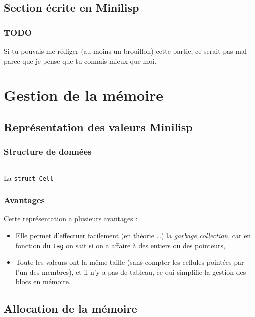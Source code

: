 \documentclass[c, 11pt, handout, xcolor=table]{beamer}
\newcommand{\source}[5]{
  \begin{table}[H]
    \centering
    \inputminted[frame=lines,linenos,style=colorful,fontfamily=tt,breaklines,autogobble,firstline=#3,firstnumber=#3,lastline=#4,label={#2[#3--#4]}]{#1}{../interim/sledge/#2}
    \captionsetup{name=Listing,labelformat=listing,labelsep=endash}
    \caption{#5}
  \end{table}
  }
\newcommand{\sourceC}[4]{\source{C}{#1}{#2}{#3}{#4}}
\newcommand{\codeC}[1]{\texttt{#1}}
\newcommand{\foreign}[1]{\emph{#1}}
\begin{document}
\subsection{Section écrite en Minilisp}

\begin{frame}
 \frametitle{TODO}
 Si tu pouvais me rédiger (au moins un brouillon) cette partie, ce serait pas mal parce que je pense que tu connais mieux que moi.
\end{frame}


\section{Gestion de la mémoire}

\subsection{Représentation des valeurs Minilisp}

\begin{frame}
 \frametitle{Structure de données}
 \sourceC{minilisp.h}{81}{91}{La \codeC{struct Cell}}
\end{frame}

\begin{frame}
 \frametitle{Avantages}
 Cette représentation a plusieurs avantages :
 \begin{itemize}
  \item Elle permet d'effectuer facilement (en théorie \ldots) la \foreign{garbage collection}, car en fonction du \codeC{tag} on sait si on a affaire à des entiers ou des pointeurs,
  \item Toute les valeurs ont la même taille (sans compter les cellules pointées par l'un des membres), et il n'y a pas de tableau, ce qui simplifie la gestion des blocs en mémoire.
 \end{itemize}
\end{frame}


\subsection{Allocation de la mémoire}
\end{document}
